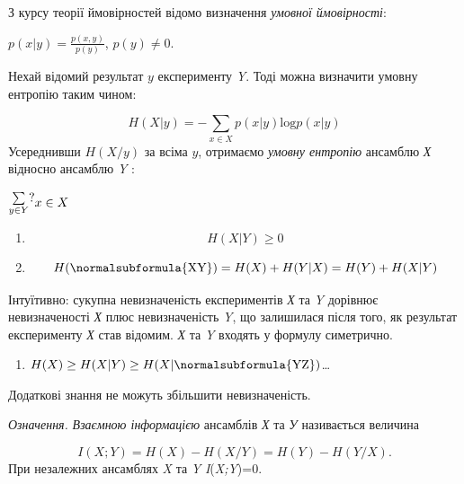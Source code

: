 З курсу теорії ймовірностей відомо визначення \textit{умовної ймовірності}:

{\centering
 ${p\left(x|y\right)=\frac{p(x,y)}{p(y)}}$,   ${p(y)\neq 0}$.
\par}

Нехай відомий результат  ${y}$ експерименту \textit{Y}. Тоді можна визначити
умовну ентропію таким чином:

\begin{equation*}
{H\left(X|y\right)=-\underset{{x\in X}}{\sum
}{p\left(x|y\right)\text{log}p\left(x|y\right)}}
\end{equation*}
Усереднивши  ${H(X/y)}$ за всіма  ${y}$, отримаємо \textit{умовну ентропію}
ансамблю  \textit{Х } відносно ансамблю \textit{Y} :

 $\begin{matrix}\underset{{y\in Y}}{\sum }?\hfill\null \end{matrix}{x\in
X}\hfill $

\liststyleWWviiiNumxxxix
\setcounter{saveenum}{\value{enumi}}
\begin{enumerate}
\setcounter{enumi}{\value{saveenum}}
\item \begin{equation*}
{H(X|Y)\ge 0}
\end{equation*}
\item \begin{equation*}
{H(\normalsubformula{\text{XY}})=H(X)+H(Y|X)=H(Y)+H(X|Y)}
\end{equation*}
\end{enumerate}
Інтуїтивно: сукупна невизначеність експериментів \textit{Х} та \textit{Y}
дорівнює невизначеності \textit{Х} плюс невизначеність \textit{Y}, що
залишилася після того, як результат експерименту \textit{Х} став відомим.
\textit{Х} та \textit{Y} входять у формулу симетрично.

\liststyleWWviiiNumxxxix
\setcounter{saveenum}{\value{enumi}}
\begin{enumerate}
\setcounter{enumi}{\value{saveenum}}
\item  ${H(X)\ge H(X|Y)\ge H(X|\normalsubformula{\text{YZ}})}$…
\end{enumerate}
Додаткові знання не можуть збільшити невизначеність.


\bigskip

\textit{Означення.}\textit{  Взаємною інформацією} ансамблів \textit{Х} та
\textit{У }називається величина 

\begin{equation*}
{I(X;Y)=H(X)-H(X/Y)=H(Y)-H(Y/X)\text{.}}
\end{equation*}
При незалежних ансамблях \textit{X} та \textit{Y} 
\textit{I}(\textit{X}\textit{;}\textit{Y})=0.



